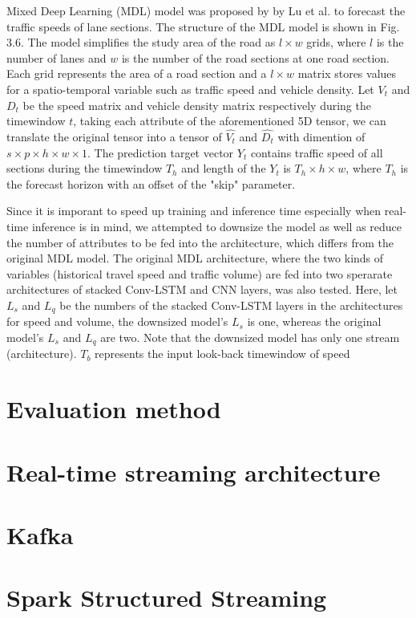 \documentclass[11pt]{uonthesis}
\begin{document}
Mixed Deep Learning (MDL) model was proposed by by Lu et al.\cite{9284587} to forecast the traffic speeds of lane sections. The structure of the MDL model is shown in Fig. 3.6. The model simplifies the study area of the road as $l{\times}w$ grids, where $l$ is the number of lanes and $w$ is the number of the road sections at one road section. Each grid represents the area of a road section and a $l{\times}w$ matrix stores values for a spatio-temporal variable such as traffic speed and vehicle density. Let $V_t$ and $D_t$ be the speed matrix and vehicle density matrix respectively during the timewindow $t$, taking each attribute of the aforementioned 5D tensor, we can translate the original tensor into a tensor of $\hat{V_t}$ and $\hat{D_t}$ with dimention of $s{\times}p{\times}h{\times}w{\times}1$. The prediction target vector $Y_t$ contains traffic speed of all sections during the timewindow $T_h$ and length of the $Y_t$ is $T_h{\times}h{\times}w$, where $T_h$ is the forecast horizon with an offset of the "skip" parameter. %

Since it is imporant to speed up training and inference time especially when real-time inference is in mind, we attempted to downsize the model as well as reduce the number of attributes to be fed into the architecture, which differs from the original MDL model. The original MDL architecture, where the two kinds of variables (historical travel speed and traffic volume) are fed into two sperarate architectures of stacked Conv-LSTM and CNN layers, was also tested. Here, let $L_s$ and $L_q$ be the numbers of the stacked Conv-LSTM layers in the architectures for speed and volume, the downsized model's $L_s$ is one, whereas the original model's $L_s$ and $L_q$ are two. Note that the downsized model has only one stream (architecture). $T_b$ represents the input look-back timewindow of speed  

\section{Evaluation method}

\section{Real-time streaming architecture}
\section{Kafka}
\section{Spark Structured Streaming}
\end{document}
